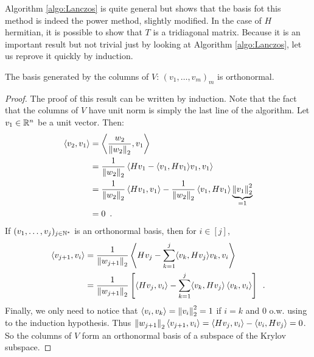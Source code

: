 \documentclass[../main.tex]{subfiles}
\begin{document}
Algorithm \ref{algo:Lanczos} is quite general but shows that the basis fot this
method is indeed the power method, slightly modified.
In the case of $H$ hermitian, it is possible to show that $T$ is a tridiagonal
matrix.
Because it is an important result but not trivial just by looking at Algorithm
\ref{algo:Lanczos}, let us reprove it quickly by induction.
\begin{lemma}\label{lemma:lanczos}
The basis generated by the columns of $V$: $(v_1, \dots, v_m)_m$ is orthonormal.
\end{lemma}
\begin{proof}
The proof of this result can be written by induction.
Note that the fact that the columns of $V$ have unit norm is simply the last
line of the algorithm.
Let $v_1\in\mathbb{R}^n$ be a unit vector.
Then:
\begin{align*}
    \langle v_2, v_1 \rangle
    &= \left\langle \frac{w_2}{\left \lVert w_2 \right \rVert_2}, v_1\right\rangle \\
	&=\frac{1}{\left \lVert w_2 \right \rVert_2} \left\langle Hv_1 - \langle v_1, Hv_1\rangle
							  v_1, v_1\right\rangle\\
    &=\frac{1}{\left \lVert w_2 \right \rVert_2} \left\langle Hv_1, v_1\right\rangle -
	\frac{1}{\left \lVert w_2 \right \rVert_2}\left\langle v_1,Hv_1\right\rangle
	\underbrace{\left \lVert v_1 \right \rVert_2^2}_{=1} \\
    &= 0\enspace.
\end{align*}
If $(v_1,\dots, v_j)_{j\in\mathbb{N}^*}$ is an orthonormal basis,
then for $i\in[j]$,
\begin{align*}
    \langle v_{j+1}, v_i \rangle
    &=\frac{1}{\left \lVert w_{j+1} \right \rVert_2}
		\left\langle Hv_j - \sum_{k=1}^j \langle v_k,
												 Hv_j\rangle
					 v_k, v_i\right\rangle \\
    &=\frac{1}{\left \lVert w_{j+1} \right \rVert_2}
	\left[
		\left\langle Hv_j, v_i\right\rangle -
		\sum_{k=1}^j \langle v_k, Hv_j\rangle \left\langle v_k,
		 v_i\right\rangle
	\right]\enspace.
\end{align*}
Finally, we only need to notice that $\langle v_i, v_k\rangle = \left \lVert v_i \right \rVert_2^2=1$
if $i=k$ and $0$ o.w. using to the induction hypothesis.
Thus $\left \lVert w_{j+1} \right \rVert_2\langle v_{j+1}, v_i\rangle = \langle Hv_j,
 v_i\rangle - \langle v_i, Hv_j\rangle=0$.
So the columns of $V$ form an orthonormal basis of a subspace of the
Krylov subspace.
\end{proof}
\end{document}
